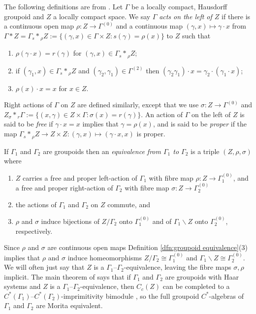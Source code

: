 \documentclass[12pt,a4paper]{amsart}
\newcommand{\fibredprod}[2]{\mathbin{\mbox{${{}_{#1}}{*}{{}_{#2}}$}}}
\begin{document}
The following definitions are from \cite[\S2]{MRW87}. Let
$\Gamma$ be a locally compact, Hausdorff groupoid and $Z$ a
locally compact space. We say $\Gamma$ \emph{acts on the left of
$Z$} if there is a continuous open map $\rho:Z\to \Gamma^{(0)}$
and a continuous map $(\gamma,x)\mapsto \gamma\cdot x$ from
$\Gamma*Z=\Gamma \fibredprod{s}{\rho}
Z:=\{(\gamma,x)\in\Gamma\times Z : s(\gamma)=\rho(x)\}$ to $Z$
such that
\begin{enumerate}
\item $\rho(\gamma\cdot x)=r(\gamma)$ for $(\gamma,x)\in
    \Gamma \fibredprod{s}{\rho} Z$;
\item if $(\gamma_1,x)\in \Gamma \fibredprod{s}{\rho} Z$
    and $(\gamma_2,\gamma_1)\in\Gamma^{(2)}$ then
    $(\gamma_2\gamma_1)\cdot x=\gamma_2\cdot (\gamma_1\cdot
    x)$;
\item $\rho(x)\cdot x=x$ for $x\in Z$.
\end{enumerate}
Right actions of $\Gamma$ on $Z$ are defined similarly, except
that we use $\sigma:Z\to \Gamma^{(0)}$ and $Z
\fibredprod{\sigma}{r} \Gamma:=\{(x,\gamma)\in Z\times \Gamma :
\sigma(x)=r(\gamma)\}$. An action of $\Gamma$ on the left of $Z$
is said to be \emph{free} if $\gamma\cdot x=x$ implies that
$\gamma = \rho(x)$, and is said to be \emph{proper} if the map
$\Gamma \fibredprod{s}{\rho} Z\to Z\times Z:(\gamma,x)\mapsto
(\gamma\cdot x,x)$ is proper.

\begin{defn}\label{dfn:groupoid equivalence}
If $\Gamma_1$ and $\Gamma_2$ are groupoids then an
\emph{equivalence from $\Gamma_1$ to
$\Gamma_2$}\label{pg-equivalence}  is a triple $(Z, \rho,
\sigma)$ where
\begin{enumerate}
\item $Z$ carries a free and proper left-action of
    $\Gamma_1$ with fibre map $\rho : Z \to
    \Gamma_1^{(0)}$, and a free and proper right-action of
    $\Gamma_2$ with fibre map $\sigma : Z \to
    \Gamma_2^{(0)}$
\item the actions of $\Gamma_1$ and $\Gamma_2$ on $Z$
    commute, and
\item $\rho$ and $\sigma$ induce  bijections of $Z/\Gamma_2$ onto
    $\Gamma_1^{(0)}$ and of $\Gamma_1\backslash Z$ onto $\Gamma^{(0)}_2$, respectively.
\end{enumerate}
\end{defn}

Since $\rho$ and $\sigma$ are continuous open maps Definition
\ref{dfn:groupoid equivalence}(3) implies that $\rho$ and
$\sigma$  induce homeomorphisms $Z/\Gamma_2 \cong
\Gamma_1^{(0)}$ and $\Gamma_1\backslash Z\cong\Gamma^{(0)}_2$.
We will often just say that $Z$ is a
$\Gamma_1$--$\Gamma_2$-equivalence, leaving the fibre maps
$\sigma,\rho$ implicit. The main theorem of \cite{MRW87} says
that if $\Gamma_1$ and $\Gamma_2$ are groupoids with Haar
systems and $Z$ is a $\Gamma_1$--$\Gamma_2$-equivalence, then
$C_c(Z)$ can be completed to a
$C^*(\Gamma_1)$--$C^*(\Gamma_2)$-imprimitivity bimodule
\cite[Theorem~2.8]{MRW87}, so the full groupoid $C^*$-algebras
of $\Gamma_1$ and $\Gamma_2$ are Morita equivalent.
\end{document}
